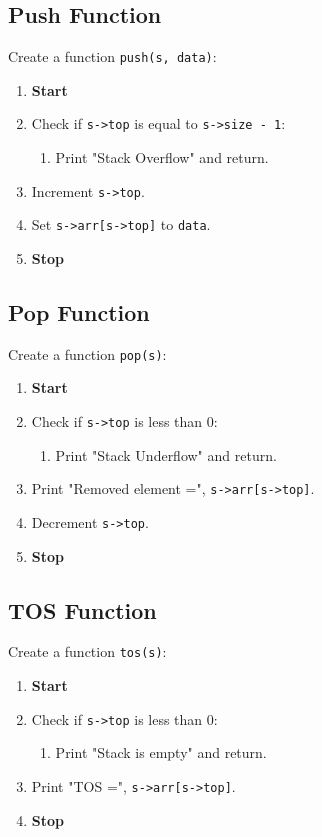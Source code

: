 {  \subsection{Push Function}
  Create a function \texttt{push(s, data)}:
  \begin{enumerate}
    \item \textbf{Start}
    \item Check if \texttt{s->top} is equal to \texttt{s->size - 1}:
          \begin{enumerate}[label=2.\arabic*.]
            \item Print "Stack Overflow" and return.
          \end{enumerate}
    \item Increment \texttt{s->top}.
    \item Set \texttt{s->arr[s->top]} to \texttt{data}.
    \item \textbf{Stop}
  \end{enumerate}

  \subsection{Pop Function}
  Create a function \texttt{pop(s)}:
  \begin{enumerate}[label=\arabic*:,left=0pt]
    \item \textbf{Start}
    \item Check if \texttt{s->top} is less than 0:
          \begin{enumerate}[label=2.\arabic*:]
            \item Print "Stack Underflow" and return.
          \end{enumerate}
    \item Print "Removed element =", \texttt{s->arr[s->top]}.
    \item Decrement \texttt{s->top}.
    \item \textbf{Stop}
  \end{enumerate}

  \subsection{TOS Function}
  Create a function \texttt{tos(s)}:
  \begin{enumerate}[label=\arabic*:]
    \item \textbf{Start}
    \item Check if \texttt{s->top} is less than 0:
          \begin{enumerate}[label=2.\arabic*:]
            \item Print "Stack is empty" and return.
          \end{enumerate}
    \item Print "TOS =", \texttt{s->arr[s->top]}.
    \item \textbf{Stop}
  \end{enumerate}

}
